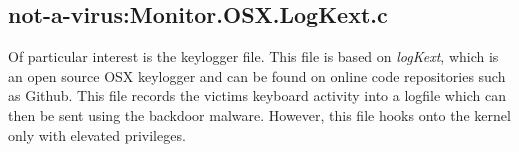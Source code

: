 \documentclass[conference]{IEEEtran}
\begin{document}
\subsection{not-a-virus:Monitor.OSX.LogKext.c}
Of particular interest is the keylogger file. This file is based on
\textit{logKext}, which is an open source OSX keylogger and can be found on
online code repositories such as Github\cite{logkext}. This file records the
victims keyboard activity into a logfile which can then be sent using the
backdoor malware. However, this file hooks onto the kernel only with elevated
privileges\cite{erwin_ventir_2014}.




\printbibliography

\end{document}
